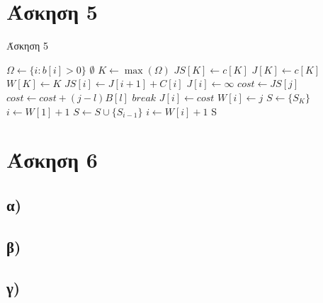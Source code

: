 \documentclass[11pt,a4paper]{book}
\begin{document}
\section*{Άσκηση 5}
\begin{algorithm}[H]
\caption{\textgreek{Άσκηση 5}}
\begin{algorithmic}[1]
	\State $\Omega \gets \{ i: b[ i ] > 0 \}$
	\If {$\Omega = \emptyset$}
		\State \Return $\emptyset$
	\EndIf
	\State $K \gets \max( \Omega )$
	\State $JS[ K ] \gets c[ K ]$
	\State $J[ K ] \gets c[ K ]$
	\State $W[ K ] \gets K$
		\State $JS[ i ] \gets J[ i + 1 ] + C[ i ]$
		\State $J[ i ] \gets \infty$
			\State $cost \gets JS[ j ]$
				\State $cost \gets cost + ( j - l )B[ l ]$
					\State $break$
				\EndIf
			\EndFor
				\State $J[ i ] \gets cost$
				\State $W[ i ] \gets j$
			\EndIf
		\EndFor
	\EndFor
	\State $S \gets \{ S_K \}$
	\State $i \gets W[ 1 ] + 1$
		\State $S \gets S \cup \{ S_{i - 1} \}$
		\State $i \gets W[ i ] + 1$
	\EndWhile
	\State \Return S
\EndProcedure
\end{algorithmic}
\end{algorithm}

\section*{Άσκηση 6}
\subsection*{α)}
\subsection*{β)}
\subsection*{γ)}
\end{document}
